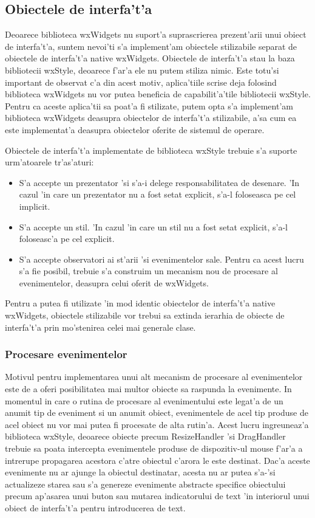 \subsection{Obiectele de interfa't'a}

Deoarece biblioteca wxWidgets nu suport'a suprascrierea prezent'arii unui obiect de interfa't'a, suntem nevoi'ti s'a implement'am obiectele stilizabile separat de obiectele de interfa't'a native wxWidgets. Obiectele de interfa't'a stau la baza bibliotecii wxStyle, deoarece f'ar'a ele nu putem stiliza nimic. Este totu'si important de observat c'a din acest motiv, aplica'tiile scrise deja folosind biblioteca wxWidgets nu vor putea beneficia de capabilit'a'tile bibliotecii wxStyle. Pentru ca aceste aplica'tii sa poat'a fi stilizate, putem opta s'a implement'am biblioteca wxWidgets deasupra obiectelor de interfa't'a stilizabile, a'sa cum ea este implementat'a deasupra obiectelor oferite de sistemul de operare.

\medskip

Obiectele de interfa't'a implementate de biblioteca wxStyle trebuie s'a suporte urm'atoarele tr'as'aturi:

\begin{itemize}
\item S'a accepte un prezentator 'si s'a-i delege responsabilitatea de desenare. 'In cazul 'in care un prezentator nu a fost setat explicit, s'a-l foloseasca pe cel implicit.
\item S'a accepte un stil. 'In cazul 'in care un stil nu a fost setat explicit, s'a-l foloseasc'a pe cel explicit.
\item S'a accepte observatori ai st'arii 'si evenimentelor sale. Pentru ca acest lucru s'a fie posibil, trebuie s'a construim un mecanism nou de procesare al evenimentelor, deasupra celui oferit de wxWidgets.
\end{itemize}

Pentru a putea fi utilizate 'in mod identic obiectelor de interfa't'a native wxWidgets, obiectele stilizabile vor trebui sa extinda ierarhia de obiecte de interfa't'a prin mo'stenirea celei mai generale clase.

\subsubsection{Procesare evenimentelor}
Motivul pentru implementarea unui alt mecanism de procesare al evenimentelor este de a oferi posibilitatea mai multor obiecte sa raspunda la evenimente. In momentul in care o rutina de procesare al evenimentului este legat'a de un anumit tip de eveniment si un anumit obiect, evenimentele de acel tip produse de acel obiect nu vor mai putea fi procesate de alta rutin'a. Acest lucru ingreuneaz'a biblioteca wxStyle, deoarece obiecte precum ResizeHandler 'si DragHandler trebuie sa poata intercepta evenimentele produse de dispozitiv-ul mouse f'ar'a a intrerupe propagarea acestora c'atre obiectul c'arora le este destinat. Dac'a aceste evenimente nu ar ajunge la obiectul destinatar, acesta nu ar putea s'a-'si actualizeze starea sau s'a genereze evenimente abstracte specifice obiectului precum ap'asarea unui buton sau mutarea indicatorului de text 'in interiorul unui obiect de interfa't'a pentru introducerea de text.

